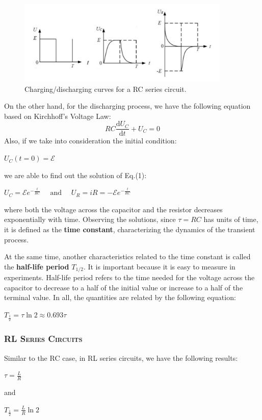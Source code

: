 \documentclass[a4paper,12pt]{article}
\begin{document}
\begin{figure}[htb] 
    \centering
    \includegraphics[width=0.9\textwidth]{Fig2} 
    \caption{Charging/discharging curves for a RC series circuit. \cite{labmanual}} 
\end{figure}

On the other hand, for the discharging process, we have the following equation based on Kirchhoff’s Voltage Law:
\begin{equation}
R C \frac{\mathrm{d} U_{C}}{\mathrm{d} t}+U_{C}=0
\end{equation}
Also, if we take into consideration the initial condition:
\begin{center}
$U_{C}(t=0)=\mathcal{E}$
\end{center}
we are able to find out the solution of Eq.(1):
\begin{center}
$U_{C}=\mathcal{E} e^{-\frac{t}{R C}} \quad \text { and } \quad U_{R}=i R=-\mathcal{E} e^{-\frac{t}{R C}}$
\end{center}
where both the voltage across the capacitor and the resistor decreases exponentially with time. Observing the solutions, since $\tau = RC$ has units of time, it is defined as the \textbf{time constant}, characterizing the dynamics of the transient process.
\par At the same time, another characteristics related to the time constant is called the \textbf{half-life period} $T_{1/2}$. It is important because it is easy to measure in experiments. Half-life period refers to the time needed for the voltage across the capacitor to decrease to a half of the initial value or increase to a half of the terminal value. In all, the quantities are related by the following equation:
\begin{center}
$\displaystyle T_{\frac{1}{2}}=\tau \ln 2 \approx 0.693 \tau$
\end{center}


\subsubsection{\textsc{RL Series Circuits}}
Similar to the RC case, in RL series circuits, we have the following results:
\begin{center}
$\displaystyle \tau = \frac{L}{R}$\\
\end{center}
and
\begin{center}
$\displaystyle T_{\frac{1}{2}}=\frac{L}{R} \ln 2$
\end{center}
\end{document}
